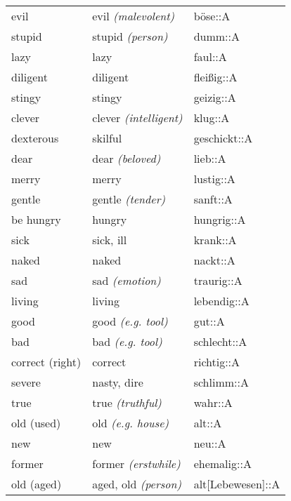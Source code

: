 \begin{center}
\begin{longtable}{lll}
{\sc \lowercase{	EVIL	}}	&	evil	\textit{\footnotesize (malevolent)}	&	böse::A	\\
{\sc \lowercase{	STUPID	}}	&	stupid	\textit{\footnotesize (person)}	&	dumm::A	\\
{\sc \lowercase{	LAZY	}}	&	lazy		&	faul::A	\\
{\sc \lowercase{	DILIGENT	}}	&	diligent		&	fleißig::A	\\
{\sc \lowercase{	STINGY	}}	&	stingy		&	geizig::A	\\
{\sc \lowercase{	CLEVER	}}	&	clever	\textit{\footnotesize (intelligent)}	&	klug::A	\\
{\sc \lowercase{	DEXTEROUS	}}	&	skilful		&	geschickt::A	\\
{\sc \lowercase{	DEAR	}}	&	dear	\textit{\footnotesize (beloved)}	&	lieb::A	\\
{\sc \lowercase{	MERRY	}}	&	merry		&	lustig::A	\\
{\sc \lowercase{	GENTLE	}}	&	gentle	\textit{\footnotesize (tender)}	&	sanft::A	\\
{\sc \lowercase{	BE HUNGRY	}}	&	hungry		&	hungrig::A	\\
{\sc \lowercase{	SICK	}}	&	sick, ill		&	krank::A	\\
{\sc \lowercase{	NAKED	}}	&	naked		&	nackt::A	\\
{\sc \lowercase{	SAD	}}	&	sad	\textit{\footnotesize (emotion)}	&	traurig::A	\\
{\sc \lowercase{	LIVING	}}	&	living		&	lebendig::A	\\
{\sc \lowercase{	GOOD	}}	&	good	\textit{\footnotesize (e.g. tool)}	&	gut::A	\\
{\sc \lowercase{	BAD	}}	&	bad	\textit{\footnotesize (e.g. tool)}	&	schlecht::A	\\
{\sc \lowercase{	CORRECT \footnotesize (RIGHT)	}}	&	correct		&	richtig::A	\\
{\sc \lowercase{	SEVERE	}}	&	nasty, dire		&	schlimm::A	\\
{\sc \lowercase{	TRUE	}}	&	true	\textit{\footnotesize (truthful)}	&	wahr::A	\\
{\sc \lowercase{	OLD \footnotesize (USED)	}}	&	old	\textit{\footnotesize (e.g. house)}	&	alt::A	\\
{\sc \lowercase{	NEW	}}	&	new		&	neu::A	\\
{\sc \lowercase{	FORMER	}}	&	former	\textit{\footnotesize (erstwhile)}	&	ehemalig::A	\\
{\sc \lowercase{	OLD \footnotesize (AGED)	}}	&	aged, old	\textit{\footnotesize (person)}	&	alt[Lebewesen]::A	\\

\end{longtable}
\end{center}
